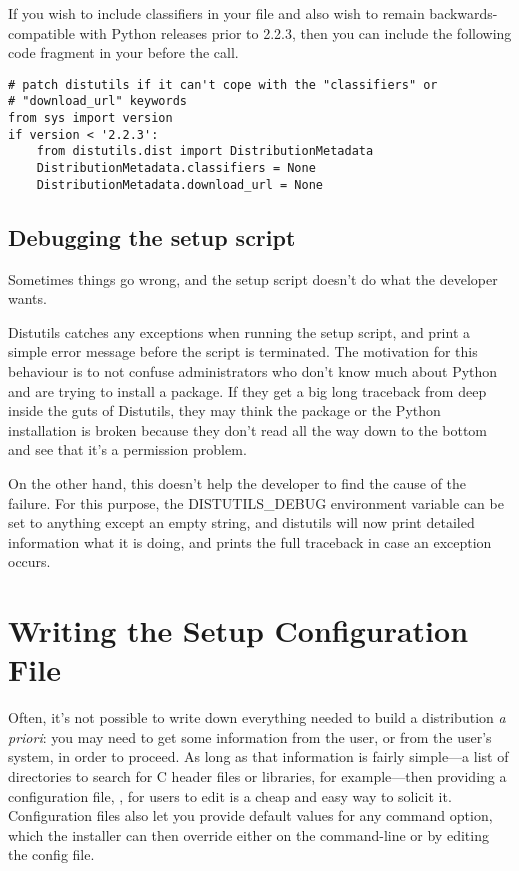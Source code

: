 \documentclass{manual}
\begin{document}
If you wish to include classifiers in your  file and also
wish to remain backwards-compatible with Python releases prior to 2.2.3,
then you can include the following code fragment in your 
before the  call.

\begin{verbatim}
# patch distutils if it can't cope with the "classifiers" or
# "download_url" keywords
from sys import version
if version < '2.2.3':
    from distutils.dist import DistributionMetadata
    DistributionMetadata.classifiers = None
    DistributionMetadata.download_url = None
\end{verbatim}


\section{Debugging the setup script}

Sometimes things go wrong, and the setup script doesn't do what the
developer wants.

Distutils catches any exceptions when running the setup script, and
print a simple error message before the script is terminated.  The
motivation for this behaviour is to not confuse administrators who
don't know much about Python and are trying to install a package.  If
they get a big long traceback from deep inside the guts of Distutils,
they may think the package or the Python installation is broken
because they don't read all the way down to the bottom and see that
it's a permission problem.

On the other hand, this doesn't help the developer to find the cause
of the failure. For this purpose, the DISTUTILS_DEBUG environment
variable can be set to anything except an empty string, and distutils
will now print detailed information what it is doing, and prints the
full traceback in case an exception occurs.

\chapter{Writing the Setup Configuration File}
\label{setup-config}

Often, it's not possible to write down everything needed to build a
distribution \emph{a priori}: you may need to get some information from
the user, or from the user's system, in order to proceed.  As long as
that information is fairly simple---a list of directories to search for
C header files or libraries, for example---then providing a
configuration file, , for users to edit is a cheap and
easy way to solicit it.  Configuration files also let you provide
default values for any command option, which the installer can then
override either on the command-line or by editing the config file.
\end{document}

